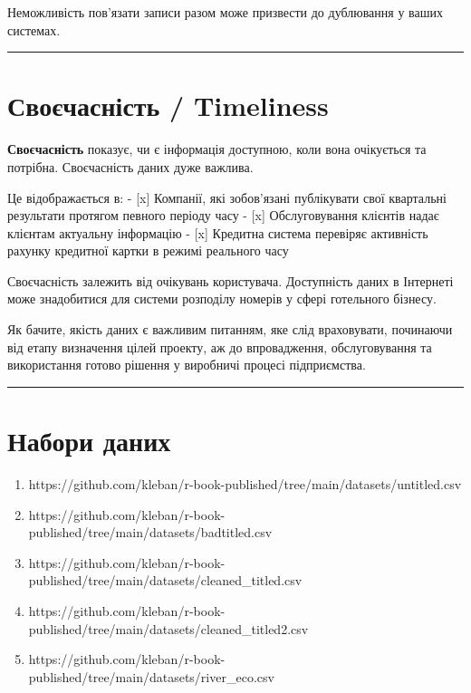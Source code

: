 \documentclass[
  letterpaper,
  DIV=11,
  numbers=noendperiod]{scrreprt}
\providecommand{\tightlist}{%
  \setlength{\itemsep}{0pt}\setlength{\parskip}{0pt}}\usepackage{longtable,booktabs,array}
\begin{document}
Неможливість пов'язати записи разом може призвести до дублювання у ваших
системах.

\begin{center}\rule{0.5\linewidth}{0.5pt}\end{center}

\section{Своєчасність /
Timeliness}\label{ux441ux432ux43eux454ux447ux430ux441ux43dux456ux441ux442ux44c-timeliness}

\textbf{Своєчасність} показує, чи є інформація доступною, коли вона
очікується та потрібна. Своєчасність даних дуже важлива.

Це відображається в: - {[}x{]} Компанії, які зобов'язані публікувати
свої квартальні результати протягом певного періоду часу - {[}x{]}
Обслуговування клієнтів надає клієнтам актуальну інформацію - {[}x{]}
Кредитна система перевіряє активність рахунку кредитної картки в режимі
реального часу

Своєчасність залежить від очікувань користувача. Доступність даних в
Інтернеті може знадобитися для системи розподілу номерів у сфері
готельного бізнесу.

Як бачите, якість даних є важливим питанням, яке слід враховувати,
починаючи від етапу визначення цілей проекту, аж до впровадження,
обслуговування та використання готово рішення у виробничі процесі
підприємства.

\begin{center}\rule{0.5\linewidth}{0.5pt}\end{center}

\section{Набори
даних}\label{ux43dux430ux431ux43eux440ux438-ux434ux430ux43dux438ux445-7}

\begin{enumerate}
\def\labelenumi{\arabic{enumi}.}
\tightlist
\item
  https://github.com/kleban/r-book-published/tree/main/datasets/untitled.csv
\item
  https://github.com/kleban/r-book-published/tree/main/datasets/badtitled.csv
\item
  https://github.com/kleban/r-book-published/tree/main/datasets/cleaned\_titled.csv
\item
  https://github.com/kleban/r-book-published/tree/main/datasets/cleaned\_titled2.csv
\item
  https://github.com/kleban/r-book-published/tree/main/datasets/river\_eco.csv
\end{enumerate}
\end{document}
